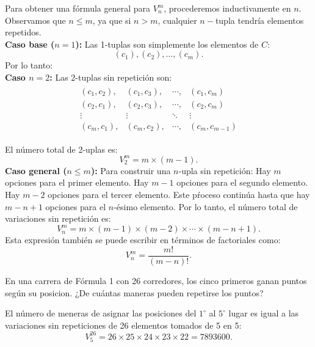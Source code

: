 \documentclass[12pt,a4paper]{book}
\begin{document}
    Para obtener una fórmula general para $V_{n}^{m}$, procederemos inductivamente en $n$. Observamos que $n\leq m$, ya que si $n\gt m$, cualquier $n-$tupla tendría elementos repetidos.\\
    \textbf{Caso base ($n=1$):} Las 1-tuplas son simplemente los elementos de $C$:
    \begin{equation*}
        (c_{1}),(c_{2}),\dots,(c_{m}).
    \end{equation*}
    Por lo tanto:\\
    \textbf{Caso $n=2$:} Las 2-tuplas sin repetición son:
    \begin{align*}
        \begin{array}{cccc}
             (c_{1},c_{2}), & (c_{1},c_{3}), & \cdots, & (c_{1},c_{m}) \\
             (c_{2},c_{1}), & (c_{2},c_{3}), & \cdots, & (c_{2},c_{m}) \\
             \vdots & \vdots & \ddots & \vdots \\
             (c_{m},c_{1}), & (c_{m},c_{2}), & \cdots, & (c_{m},c_{m-1})
        \end{array}
    \end{align*}

    El número total de 2-uplas es:
    \begin{equation*}
        V_{2}^{m}=m\times(m-1).
    \end{equation*}
    \textbf{Caso general ($n\leq m$):} Para construir una $n$-upla sin repetición: Hay
    $m$ opciones para el primer elemento. Hay $m-1$ opciones para el segundo elemento.
    Hay $m-2$ opciones para el tercer elemento. Este pŕoceso continúa hasta que hay
    $m-n+1$ opciones para el $n$-ésimo elemento. Por lo tanto, el número total de
    variaciones sin repetición es:
    \begin{equation*}
        V_{n}^{m}=m\times(m-1)\times(m-2)\times\cdots\times(m-n+1).
    \end{equation*}
    Esta expresión también se puede escribir en términos de factoriales como:
    \begin{equation*}
        V_{n}^{m}=\frac{m!}{(m-n)!}.
    \end{equation*}

    \begin{mdframed}[style=mdgraybox,frametitle={Problema 17: Reparto de puntos en Fórmula 1}]
        En una carrera de Fórmula 1 con 26 corredores, los cinco primeros ganan puntos
        según su posicion. ¿De cuántas maneras pueden repetirse los puntos?
    \end{mdframed}
    \begin{solucion}
        El número de meneras de asignar las posiciones del $1^{\circ}$ al $5^{\circ}$
        lugar es igual a las variaciones sin repeticiones de 26  elementos tomados de
        5 en 5:
        \begin{equation*}
            V_{5}^{26}=26\times25\times24\times23\times22=7893600.
        \end{equation*}
    \end{solucion}
\end{document}
